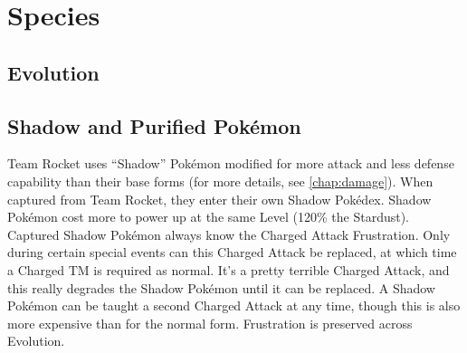 \chapter{Species}

\section{Evolution}

\section{Shadow and Purified Pokémon}
Team Rocket uses ``Shadow'' Pokémon modified for more attack
 and less defense capability than their base forms (for more details,
 see \autoref{chap:damage}).
When captured from Team Rocket, they enter their own Shadow Pokédex.
Shadow Pokémon cost more to power up at the same Level (120\% the Stardust).
Captured Shadow Pokémon always know the Charged Attack Frustration.
Only during certain special events can this Charged Attack be replaced,
 at which time a Charged TM is required as normal.
It's a pretty terrible Charged Attack, and this really degrades the
 Shadow Pokémon until it can be replaced.
A Shadow Pokémon can be taught a second Charged Attack at any
 time, though this is also more expensive than for the normal form.
Frustration is preserved across Evolution.

